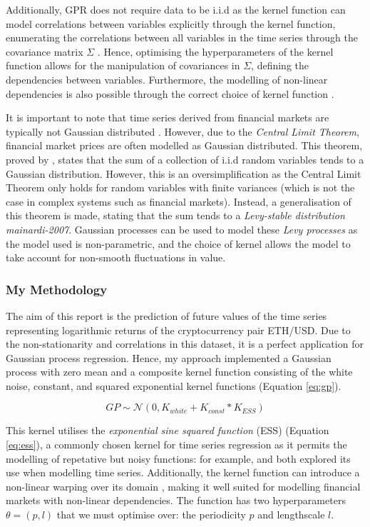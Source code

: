 \documentclass[a4paper, 11pt]{article}
\begin{document}
    Additionally, GPR does not require data to be i.i.d as the kernel function can model correlations between variables explicitly through the kernel function, enumerating the correlations between all variables in the time series through the covariance matrix $\Sigma$ \cite{roberts-2013}. Hence, optimising the hyperparameters of the kernel function allows for the manipulation of covariances in $\Sigma$, defining the dependencies between variables. Furthermore, the modelling of non-linear dependencies is also possible through the correct choice of kernel function \cite{bitvai-2016}.

    It is important to note that time series derived from financial markets are typically not Gaussian distributed \cite{bitvai-2016}. However, due to the \emph{Central Limit Theorem}, financial market prices are often modelled as Gaussian distributed. This theorem, proved by \cite{laplace-1810}, states that the sum of a collection of i.i.d random variables tends to a Gaussian distribution. However, this is an oversimplification as the Central Limit Theorem only holds for random variables with finite variances (which is not the case in complex systems such as financial markets). Instead, a generalisation of this theorem is made, stating that the sum tends to a \emph{Levy-stable distribution} \emph{mainardi-2007}. Gaussian processes can be used to model these \emph{Levy processes} as the model used is non-parametric, and the choice of kernel allows the model to take account for non-smooth fluctuations in value.

    \subsubsection{My Methodology}

    The aim of this report is the prediction of future values of the time series representing logarithmic returns of the cryptocurrency pair ETH/USD. Due to the non-stationarity and correlations in this dataset, it is a perfect application for Gaussian process regression. Hence, my approach implemented a Gaussian process with zero mean and a composite kernel function consisting of the white noise, constant, and squared exponential kernel functions (Equation \ref{eq:gp}). 

    \begin{equation}
        GP \sim \mathcal{N}(0, K_{white} + K_{const} * K_{ESS})
        \label{eq:gp}
    \end{equation}

    This kernel utilises the \emph{exponential sine squared function} (ESS) \cite{mackay-1998} (Equation \ref{eq:ess}), a commonly chosen kernel for time series regression as it permits the modelling of repetative but noisy functions: for example,  and  both explored its use when modelling time series. Additionally, the kernel function can introduce a non-linear warping over its domain \cite{rasmussen-2006}, making it well suited for modelling financial markets with non-linear dependencies. The function has two hyperparameters $\theta = (p, l)$ that we must optimise over: the periodicity $p$ and lengthscale $l$.
\end{document}
